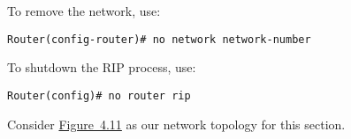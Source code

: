 \documentclass{../UTNetLab}
\begin{document}
    To remove the network, use:
    \begin{lstlisting}[language={cisco}, emph={network-number}]
Router(config-router)# no network network-number
    \end{lstlisting}
    To shutdown the RIP process, use:
    \begin{lstlisting}[language={cisco}]
Router(config)# no router rip
    \end{lstlisting}
    Consider \hyperref[fig:4.11]{Figure~4.11} as our network topology for this section.

    
\end{document}
